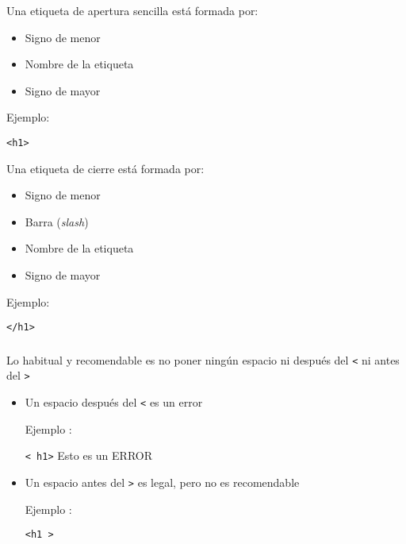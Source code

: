 \documentclass[ucs]{beamer}
\begin{document}
\begin{frame}[fragile]
\frametitle{}

Una etiqueta de apertura sencilla está formada por:
\begin{itemize}
\item
Signo de menor
\item
Nombre de la etiqueta
\item
Signo de mayor
\end{itemize}


Ejemplo:

\verb|<h1>|

Una etiqueta de cierre está formada por:

\begin{itemize}
\item
Signo de menor
\item
Barra (\emph{slash})
\item
Nombre de la etiqueta
\item
Signo de mayor
\end{itemize}


Ejemplo:

\verb|</h1>|

\end{frame}




\begin{frame}[fragile]
\frametitle{}

Lo habitual y recomendable es no poner ningún espacio ni después del
\verb|<|
ni antes del
\verb|>|


    \begin{itemize}
    \item
Un espacio después del \verb|<| es un error

Ejemplo :

\verb|< h1>|
Esto es un ERROR
    \item
Un espacio antes del \verb|>| es legal, pero no es recomendable

Ejemplo :

\verb|<h1 >|

    \end{itemize}


\end{frame}
\end{document}
